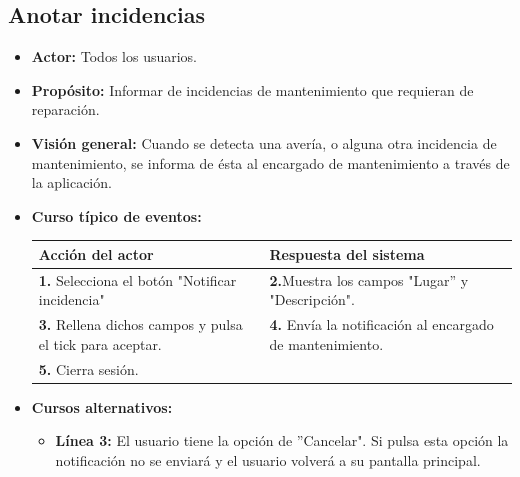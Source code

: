 \documentclass[spanish,a4paper,12pt]{report}	%
\begin{document}
		\subsection{Anotar incidencias}	
			\begin{itemize}
				\item \textbf{Actor: } Todos los usuarios.
				\item \textbf{Propósito: } Informar de incidencias de mantenimiento que requieran de reparación. 		
				\item \textbf{Visión general: } Cuando se detecta una avería, o alguna otra incidencia de mantenimiento, se informa de ésta al encargado de mantenimiento a través de la aplicación.  
				\item \textbf{Curso típico de eventos:}\\ 
				\begin{tabular}{|p{6cm}||p{6cm}|}
					\hline
					\textbf{Acción del actor} & \textbf{Respuesta del sistema} \\ \hline \hline
					\textbf{1.} Selecciona el botón "Notificar incidencia" & \textbf{2.}Muestra los campos "Lugar'' y "Descripción".\\ \hline 
					\textbf{3.} Rellena dichos campos y pulsa el tick para aceptar. & \textbf{4.} Envía la notificación al encargado de mantenimiento.\\ \hline
					\textbf{5.} Cierra sesión. & \\ \hline

				\end{tabular}
				\item \textbf{Cursos alternativos:} 
					\begin{itemize}
						\item \textbf{Línea 3: }El usuario tiene la opción de ''Cancelar". Si pulsa esta opción la notificación no se enviará y el usuario volverá a su pantalla principal.
					\end{itemize}
			\end {itemize}

		\hspace{-1.5 true cm}
\end{document}
